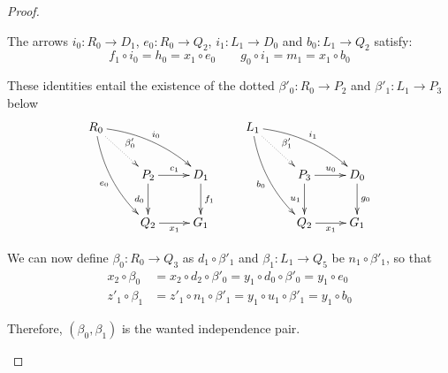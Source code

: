 \documentclass[a4paper,UKenglish,cleveref,pdftex,thm-restate,numberwithinsect,anonymous]{lipics}
\begin{document}
\begin{proof}
\begin{enumerate}
		The arrows $i_0\colon R_0\to D_1$,
		$e_0\colon R_0\to Q_2$, $i_1\colon L_1\to D_0$ and $b_0\colon L_1 \to Q_2$ satisfy:
		\[
		f_1\circ i_0  = h_0 =x_1\circ e_0 \qquad 
		g_0\circ i_1 = m_1 = x_1 \circ b_0 \]

		These identities entail the existence of the dotted
		$\beta'_0\colon R_0\to P_2$ and $\beta'_1\colon L_1\to P_3$ below
		\[\xymatrix{R_0 \ar@{.>}[dr]^{\beta'_0} \ar@/^.3cm/[drr]^{i_0}
			\ar@/_.3cm/[ddr]_{e_0} &&& L_1 \ar@{.>}[dr]^{\beta'_1} \ar@/^.3cm/[drr]^{i_1}
			\ar@/_.3cm/[ddr]_{b_0}\\ &P_2 \ar[r]^{c_1} \ar[d]_{d_0}& D_1
			\ar[d]^{f_1} & &P_3 \ar[r]^{u_0} \ar[d]_{u_1}& D_0
			\ar[d]^{g_0}\\ &Q_2\ar[r]_{x_1} & G_1 & &Q_2\ar[r]_{x_1} & G_1}\]
	
	We can now define $\beta_0\colon R_0\to Q_3$ as $d_1\circ \beta'_1$ and $\beta_1\colon L_1\to Q_5$ be $n_1\circ \beta'_1$, so that
		\begin{align*}
			x_2\circ \beta_0 & =x_2\circ d_2\circ \beta'_0 = y_1\circ d_0\circ \beta'_0=y_1\circ e_0\\
			z'_1 \circ \beta_1 & = z'_1 \circ n_1\circ \beta'_1 =y_1\circ u_1\circ \beta'_1=y_1\circ b_0
		\end{align*}
	
		Therefore, $(\beta_0, \beta_1)$ is the wanted independence pair.
		

\end{enumerate}
\end{proof}
\end{document}
